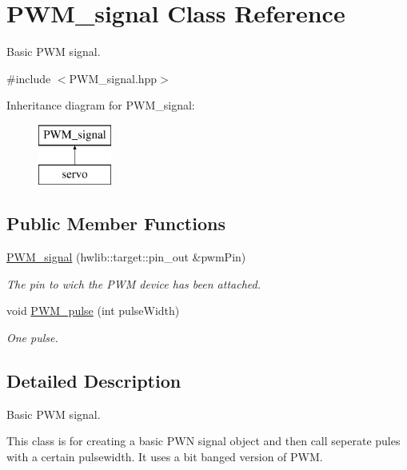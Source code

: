\hypertarget{class_p_w_m__signal}{}\section{P\+W\+M\+\_\+signal Class Reference}
\label{class_p_w_m__signal}


Basic P\+WM signal.  




{\ttfamily \#include $<$P\+W\+M\+\_\+signal.\+hpp$>$}

Inheritance diagram for P\+W\+M\+\_\+signal\+:\begin{figure}[H]
\begin{center}
\leavevmode
\includegraphics[height=2.000000cm]{class_p_w_m__signal}
\end{center}
\end{figure}
\subsection*{Public Member Functions}
\begin{DoxyCompactItemize}
\item 
\hyperlink{class_p_w_m__signal_ad64aad0e6fe9cf246715bc9cf0f78247}{P\+W\+M\+\_\+signal} (hwlib\+::target\+::pin\+\_\+out \&pwm\+Pin)
\begin{DoxyCompactList}\small\item\em The pin to wich the P\+WM device has been attached. \end{DoxyCompactList}\item 
void \hyperlink{class_p_w_m__signal_a82a9e4648b24a15992b59918e640157c}{P\+W\+M\+\_\+pulse} (int pulse\+Width)
\begin{DoxyCompactList}\small\item\em One pulse. \end{DoxyCompactList}\end{DoxyCompactItemize}


\subsection{Detailed Description}
Basic P\+WM signal. 

This class is for creating a basic P\+WN signal object and then call seperate pules with a certain pulsewidth. It uses a bit banged version of P\+WM. 

